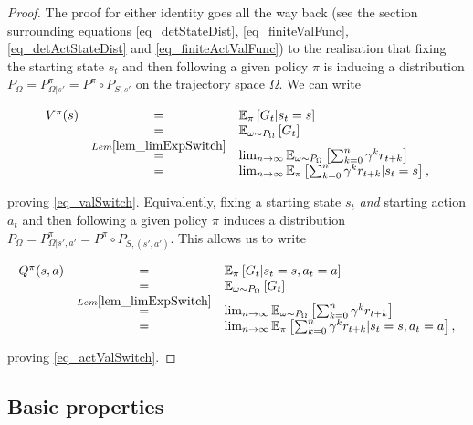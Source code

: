 \documentclass[11pt]{article} %
\begin{document}
\begin{proof}
	The proof for either identity goes all the way back (see the section surrounding equations \ref{eq_detStateDist}, \ref{eq_finiteValFunc}, \ref{eq_detActStateDist} and \ref{eq_finiteActValFunc}) to the realisation that fixing the starting state $s_t$  and then following a given policy $\pi$ is inducing a distribution $P_{\Omega} = P_{\Omega | s'}^{\pi} = P^{\pi} \circ P_{S,s'}$ on the trajectory space $\Omega$. We can write

	\begin{equation}
		\begin{array}{rcl}
		V^{\pi}(s) & = & \mathbb{E}_{\pi}\left[ G_t | s_t = s \right] \\
				& = & \mathbb{E}_{\omega \sim P_\Omega}\left[ G_t \right] \\
				& \overset{Lem \ref{lem_limExpSwitch}}{=} & \lim_{n \rightarrow \infty} \mathbb{E}_{\omega \sim P_\Omega}\left[ \sum_{k=0}^n \gamma^k r_{t+k} \right] \\
				& = & \lim_{n \rightarrow \infty} \mathbb{E}_{\pi}\left[ \sum_{k=0}^n \gamma^k r_{t+k} | s_t = s \right],
		\end{array}
	\end{equation}

	proving \ref{eq_valSwitch}. Equivalently, fixing a starting state $s_t$ \textit{and} starting action $a_t$ and then following a given policy $\pi$ induces a distribution $P_{\Omega} = P_{\Omega | s',a'}^{\pi} = P^{\pi} \circ P_{S,(s',a')}$. This allows us to write

	\begin{equation}
		\begin{array}{rcl}
		Q^{\pi}(s,a) & = & \mathbb{E}_{\pi}\left[ G_t | s_t = s, a_t = a \right] \\
				& = & \mathbb{E}_{\omega \sim P_\Omega}\left[ G_t \right] \\
				& \overset{Lem \ref{lem_limExpSwitch}}{=} & \lim_{n \rightarrow \infty} \mathbb{E}_{\omega \sim P_\Omega}\left[ \sum_{k=0}^n \gamma^k r_{t+k} \right] \\
				& = & \lim_{n \rightarrow \infty} \mathbb{E}_{\pi}\left[ \sum_{k=0}^n \gamma^k r_{t+k} | s_t = s, a_t = a \right],
		\end{array}
	\end{equation}

	proving \ref{eq_actValSwitch}.

\end{proof}

\subsection{Basic properties}
\end{document}
